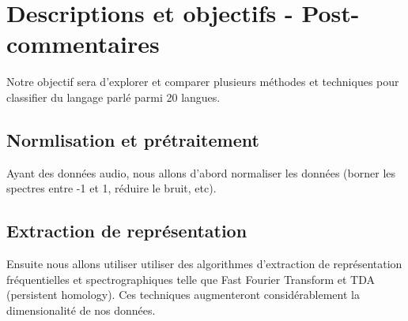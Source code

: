 \documentclass{article}
\begin{document}
\begin{comment}
\section{Contributions de chaque membre de l'équipe}
Chaque membre de l'équipe se chargera de faire les trois pipelines (1.1, 1.2, 1.3) pour un jeux de données spécifiques.\\
\section{Source de données}
\subsection{}
Notre premier jeu de données est un ensemble de prononciations des catégories de MNIST. Voici le lien vers les données: \href{https://github.com/Jakobovski/free-spoken-digit-dataset/tree/master}{https://github.com/Jakobovski/free-spoken-digit-dataset/tree/master}
\subsection{}
Notre deuxième jeu de données est un ensemble de languages parlé qui est libelé avec la langue qui est parlé dans l'extrait sonore. Voici le lien vers les données: \href{https://huggingface.co/datasets/common_language}{https://huggingface.co/datasets/common_language}
\subsection{}
Notre troisième jeu de données est un ensemble de données musicales qui est libelé avec le genre de musique. Voici le lien vers les données: \href{https://huggingface.co/datasets/marsyas/gtzan}{https://huggingface.co/datasets/marsyas/gtzan}
\end{comment}
\section*{Descriptions et objectifs - Post-commentaires}
Notre objectif sera d'explorer et comparer plusieurs méthodes et techniques pour classifier du langage parlé parmi 20 langues. 
\subsection*{Normlisation et prétraitement}
Ayant des données audio, nous allons d'abord normaliser les données (borner les spectres entre -1 et 1, réduire le bruit, etc). 
\subsection*{Extraction de représentation}Ensuite nous allons utiliser utiliser des algorithmes d'extraction de représentation fréquentielles et spectrographiques telle que Fast Fourier Transform et TDA (persistent homology). Ces techniques augmenteront considérablement la dimensionalité de nos données. 
\end{document}
